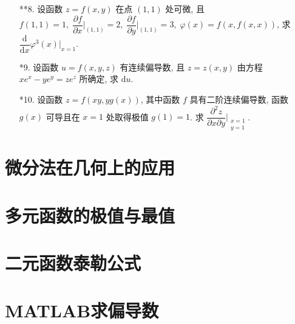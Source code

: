 \begin{enumerate}
    \item[**8.] 设函数 $z=f(x, y)$ 在点 $(1, 1)$ 处可微, 且 $f(1, 1)=1,\;\dfrac{\partial f}{\partial x}\bigg|_{(1, 1)}=2,\;\dfrac{\partial f}{\partial y}\bigg|_{(1, 1)}=3,\;\varphi(x)=f(x, f(x,x))$, 求 $\dfrac{\text{d}}{\text{d}x}\varphi^3(x)\bigg|_{x=1}$.
    
    \item[*9.] 设函数 $u=f(x, y, z)$ 有连续偏导数, 且 $z=z(x, y)$ 由方程 $xe^x-ye^y=ze^z$ 所确定, 求 $\text{d}u$.
     
    \item[*10.] 设函数 $z=f(xy, yg(x))$, 其中函数 $f$ 具有二阶连续偏导数, 函数 $g(x)$ 可导且在 $x=1$ 处取得极值 $g(1)=1$. 求 $\dfrac{\partial^2z}{\partial x\partial y}\bigg|_{\substack{x=1\\y=1}}$.  
\end{enumerate}

\section{微分法在几何上的应用}


\section{多元函数的极值与最值}


\section{二元函数泰勒公式}


\section{MATLAB求偏导数}